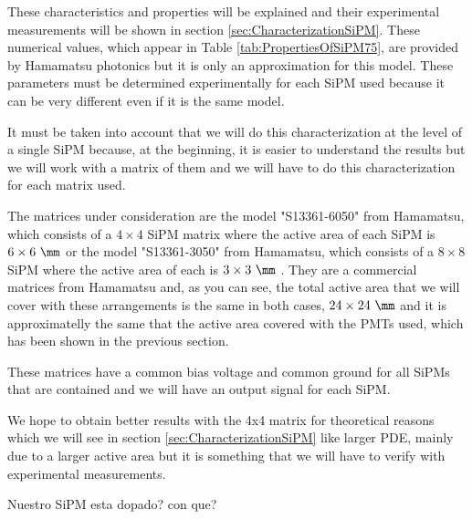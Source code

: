 These characteristics and properties will be explained and their experimental measurements will be shown in section \ref{sec:CharacterizationSiPM}. These numerical values, which appear in Table \ref{tab:PropertiesOfSiPM75}, are provided by Hamamatsu photonics but it is only an approximation for this model. These parameters must be determined experimentally for each SiPM used because it can be very different even if it is the same model.

It must be taken into account that we will do this characterization at the level of a single SiPM because, at the beginning, it is easier to understand the results but we will work with a matrix of them and we will have to do this characterization for each matrix used. 

The matrices under consideration are the model "S13361-6050" from Hamamatsu, which consists of a $4\times 4$ SiPM matrix where the active area of each SiPM is $6\times 6~\mm$ \cite{DataSheetHammamatsu_array_SiPM_6050} or the model "S13361-3050" from Hamamatsu, which consists of a $8\times 8$ SiPM where the active area of each is $3\times 3~\mm$ \cite{DataSheetHammamatsu_array_SiPM_3050}. They are a commercial matrices from Hamamatsu and, as you can see, the total active area that we will cover with these arrangements is the same in both cases, $24\times 24~\mm$ and it is approximatelly the same that the active area covered with the PMTs used, which has been shown in the previous section.

These matrices have a common bias voltage and common ground for all SiPMs that are contained and we will have an output signal for each SiPM. 

We hope to obtain better results with the 4x4 matrix for theoretical reasons which we will see in section \ref{sec:CharacterizationSiPM} like larger PDE, mainly due to a larger active area but it is something that we will have to verify with experimental measurements.




Nuestro SiPM esta dopado? con que?
